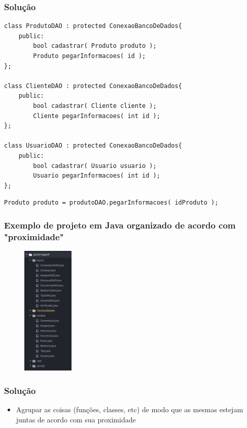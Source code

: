 \begin{frame}[fragile]
	\frametitle{Solução}

	\begin{listing}[H]
		\begin{verbatim}
class ProdutoDAO : protected ConexaoBancoDeDados{
	public:
		bool cadastrar( Produto produto );
		Produto pegarInformacoes( id );
};

class ClienteDAO : protected ConexaoBancoDeDados{
	public:
		bool cadastrar( Cliente cliente );
		Cliente pegarInformacoes( int id );
};

class UsuarioDAO : protected ConexaoBancoDeDados{
	public:
		bool cadastrar( Usuario usuario );
		Usuario pegarInformacoes( int id );
};
		\end{verbatim}
	\end{listing}

	\begin{listing}[H]
		\begin{verbatim}
Produto produto = produtoDAO.pegarInformacoes( idProduto );
		\end{verbatim}
	\end{listing}

\end{frame}

\begin{frame}
	\frametitle{Exemplo de projeto em Java organizado de acordo com "proximidade"}

	\begin{figure}
		\includegraphics[width=0.22\textwidth]{figuras/organizacao}
		\label{figure:ProjetoOrganizado}
	\end{figure}

\end{frame}


\begin{frame}
	\frametitle{Solução}

	\begin{itemize}
		\item Agrupar as coisas (funções, classes, etc) de modo que as mesmas estejam juntas de acordo com sua proximidade
	\end{itemize}

\end{frame}
